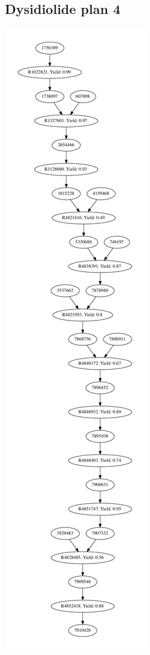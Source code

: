 \documentclass[a4paper,10pt,titlepage]{paper}
\begin{document}
\subsection{Dysidiolide plan 4}
\centering
\includegraphics[scale=0.3]{Synteseplaner/Dysidiolide/plan4.pdf}
\label{Appendix::Dysidiolide4}
\end{document}
